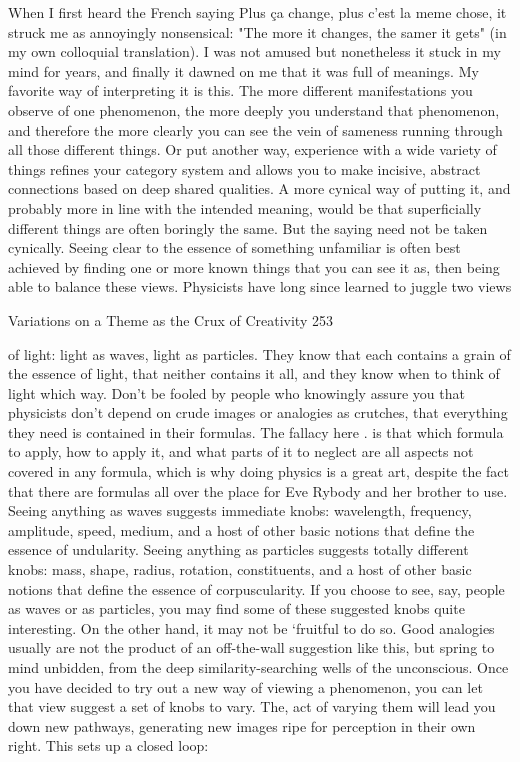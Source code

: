         When I first heard the French saying Plus ça change, plus c'est la meme chose,
it struck me as annoyingly nonsensical: "The more it changes, the samer it gets" (in
my own colloquial translation). I was not amused but nonetheless it stuck in my mind
for years, and finally it dawned on me that it was full of meanings. My favorite way
of interpreting it is this. The more different manifestations you observe of one
phenomenon, the more deeply you understand that phenomenon, and therefore the
more clearly you can see the vein of sameness running through all those different
things. Or put another way, experience with a wide variety of things refines your
category system and allows you to make incisive, abstract connections based on deep
shared qualities. A more cynical way of putting it, and probably more in line with the
intended meaning, would be that superficially different things are often boringly the
same. But the saying need not be taken cynically.
        Seeing clear to the essence of something unfamiliar is often best achieved by
finding one or more known things that you can see it as, then being able to balance
these views. Physicists have long since learned to juggle two views




Variations on a Theme as the Crux of Creativity                                       253

of light: light as waves, light as particles. They know that each contains a grain of the
essence of light, that neither contains it all, and they know when to think of light
which way. Don't be fooled by people who knowingly assure you that physicists don't
depend on crude images or analogies as crutches, that everything they need is
contained in their formulas. The fallacy here
        . is that which formula to apply, how to apply it, and what parts of it to neglect
are all aspects not covered in any formula, which is why doing physics is a great art,
despite the fact that there are formulas all over the place for Eve Rybody and her
brother to use.
        Seeing anything as waves suggests immediate knobs: wavelength, frequency,
amplitude, speed, medium, and a host of other basic notions that define the essence of
undularity. Seeing anything as particles suggests totally different knobs: mass, shape,
radius, rotation, constituents, and a host of other basic notions that define the essence
of corpuscularity. If you choose to see, say, people as waves or as particles, you may
find some of these suggested knobs quite interesting. On the other hand, it may not be
`fruitful to do so. Good analogies usually are not the product of an off-the-wall
suggestion like this, but spring to mind unbidden, from the deep similarity-searching
wells of the unconscious.
        Once you have decided to try out a new way of viewing a phenomenon, you
can let that view suggest a set of knobs to vary. The, act of varying them will lead you
down new pathways, generating new images ripe for perception in their own right.
This sets up a closed loop:

